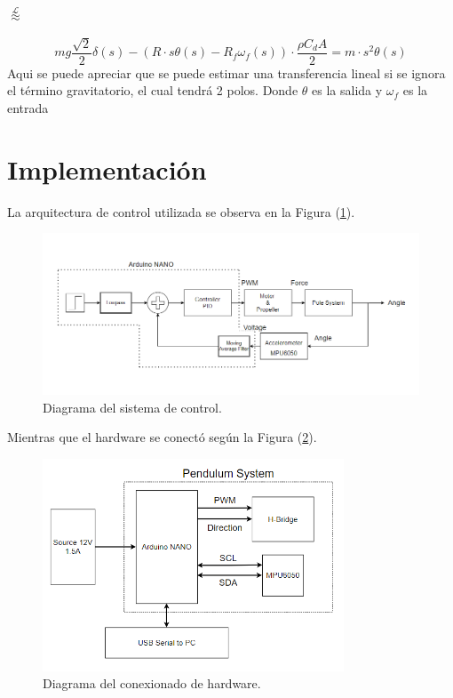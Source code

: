 \begin{huge}
\begin{center}
	$\stackrel{\mathcal{L}}{\approx}$
\end{center}
\end{huge}

\begin{equation}
mg\frac{\sqrt{2}}{2} \delta(s) - \left( R\cdot s\theta(s) - R_f \omega_f(s) \right)\cdot \frac{\rho C_d A}{2} = m\cdot s^2\theta(s)   
\end{equation}
Aqui se puede apreciar que se puede estimar una transferencia lineal si se ignora el término gravitatorio, el cual tendrá 2 polos. Donde $\theta$ es la salida y $\omega_f$ es la entrada

\section{Implementación}

La arquitectura de control utilizada se observa en la Figura (\ref{fig:controlsys}).

\begin{figure}[H]
    \centering
    \includegraphics[width=1.1\textwidth]{./Imagenes/controlsystem.png}
    \caption{Diagrama del sistema de control.}
    \label{fig:controlsys}
\end{figure}


Mientras que el hardware se conectó según la Figura (\ref{fig:hardwaresys}).

\begin{figure}[H]
    \centering
    \includegraphics[width=0.8\textwidth]{./Imagenes/hardwaresystem.png}
    \caption{Diagrama del conexionado de hardware.}
    \label{fig:hardwaresys}
\end{figure}

